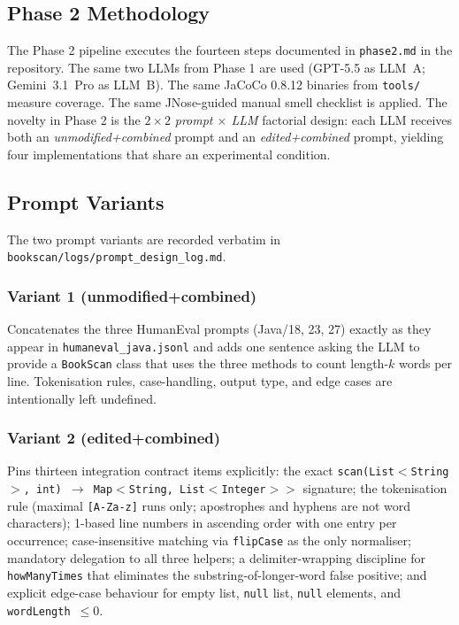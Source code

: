 \documentclass[journal]{IEEEtran}
\begin{document}
\subsection{Phase 2 Methodology}
\label{sec:p2method}

The Phase 2 pipeline executes the fourteen steps documented in
\texttt{phase2.md} in the repository. The same two LLMs from
Phase 1 are used (GPT-5.5 as LLM~A; Gemini~3.1~Pro as LLM~B).
The same JaCoCo 0.8.12 binaries from \texttt{tools/} measure
coverage. The same JNose-guided manual smell checklist is
applied. The novelty in Phase 2 is the $2 \times 2$
\emph{prompt $\times$ LLM} factorial design: each LLM receives
both an \emph{unmodified+combined} prompt and an
\emph{edited+combined} prompt, yielding four implementations
that share an experimental condition.

\subsection{Prompt Variants}
\label{sec:p2prompts}

The two prompt variants are recorded verbatim in
\texttt{bookscan/logs/prompt\_design\_log.md}.

\subsubsection*{Variant 1 (unmodified+combined)}
Concatenates the three HumanEval prompts (Java/18, 23, 27)
exactly as they appear in \texttt{humaneval\_java.jsonl} and
adds one sentence asking the LLM to provide a
\texttt{BookScan} class that uses the three methods to count
length-$k$ words per line. Tokenisation rules, case-handling,
output type, and edge cases are intentionally left undefined.

\subsubsection*{Variant 2 (edited+combined)}
Pins thirteen integration contract items explicitly: the exact
\texttt{scan(List$<$String$>$, int)~$\rightarrow$~Map$<$String,
List$<$Integer$>$$>$} signature; the tokenisation rule (maximal
\texttt{[A-Za-z]} runs only; apostrophes and hyphens are not
word characters); 1-based line numbers in ascending order with
one entry per occurrence; case-insensitive matching via
\texttt{flipCase} as the only normaliser; mandatory delegation
to all three helpers; a delimiter-wrapping discipline for
\texttt{howManyTimes} that eliminates the
substring-of-longer-word false positive; and explicit edge-case
behaviour for empty list, \texttt{null} list, \texttt{null}
elements, and \texttt{wordLength}~$\leq 0$.
\end{document}
